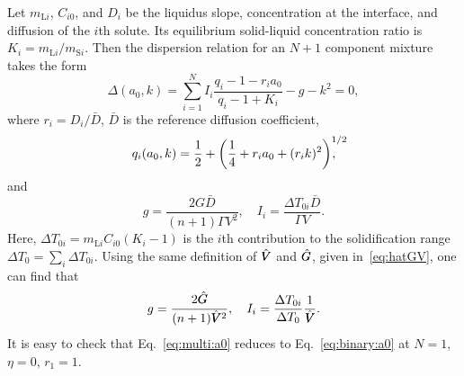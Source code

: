 \documentclass{article}
\newcommand{\liq}{\text{L}}
\newcommand{\sol}{\text{S}}
\newcommand{\hV}[1][\qty(\bar{V})]{\vphantom{#1}\mathrlap{\smash{\hat{V}}}V}
\newcommand{\hG}[1][\qty(\bar{G})]{\vphantom{#1}\mathrlap{\smash{\hat{G}}}G}
\begin{document}
Let $m_{\liq i}$, $C_{i0}$, and $D_i$ be the liquidus slope, concentration at the interface,
and diffusion of the $i$th solute.
Its equilibrium solid-liquid concentration ratio is $K_i = m_{\liq i}/m_{\sol i}$.
Then the dispersion relation for an $N+1$ component mixture takes the form
\begin{equation}\label{eq:multi:a0}
    \Delta(a_0,k) = \sum_{i=1}^{N}I_i\frac{q_i - 1 - r_ia_0}{q_i - 1 + K_i} - g - k^2 = 0,
\end{equation}
where $r_i = D_i/\bar{D}$, $\bar{D}$ is the reference diffusion coefficient,
\begin{equation}\label{eq:multi:q}
    q_i(a_0,k) = \frac12 + \qty(\frac14 + r_ia_0 + (r_ik)^2)^{\mathrlap{1/2}},
\end{equation}
and
\begin{equation}\label{eq:multi:gI}
    g = \frac{2G\bar{D}}{(n+1)\Gamma V^2}, \quad I_i = \frac{\Delta{T}_{0i}\bar{D}}{\Gamma V}.
\end{equation}
Here, $\Delta{T}_{0i} = m_{\liq i}C_{i0}(K_i-1)$ is the $i$th contribution to the solidification range
$\Delta{T}_0 = \sum_i \Delta{T}_{0i}$.
Using the same definition of $\hV$ and $\hG$, given in~\eqref{eq:hatGV}, one can find that
\begin{equation}\label{eq:multi:gI2}
    g = \frac{2\hG}{(n+1)\hV^2}, \quad I_i = \frac{\Delta{T}_{0i}}{\Delta{T}_0}\frac1{\hV}.
\end{equation}
It is easy to check that Eq.~\eqref{eq:multi:a0} reduces to Eq.~\eqref{eq:binary:a0} at $N=1$, $\eta=0$, $r_1=1$.

\printbibliography
\end{document}
